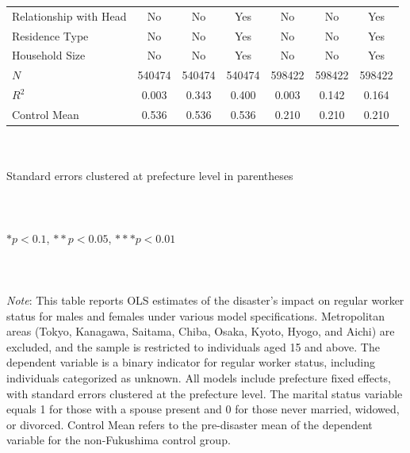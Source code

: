 \documentclass[serif, aspectratio=169]{beamer}
\newcommand{\regularlinks}{%
    \vfill %
    \hfill %
    {\small %
        \hyperlink{regular_placebo}{\beamerbutton{Placebo test}} \,
    }
}
\begin{document}
\begin{frame}[label=regular_status]
\begin{table}[htbp]
\begin{tabular}{@{}l*{6}{c}@{}}
Relationship with Head&       No         &       No         &      Yes         &       No         &       No         &      Yes         \\
Residence Type&       No         &       No         &      Yes         &       No         &       No         &      Yes         \\
Household Size&       No         &       No         &      Yes         &       No         &       No         &      Yes         \\
$\textit{N}$&   540474         &   540474         &   540474         &   598422         &   598422         &   598422         \\
$\textit{R}^2$&    0.003         &    0.343         &    0.400         &    0.003         &    0.142         &    0.164         \\
Control Mean&    0.536         &    0.536         &    0.536         &    0.210         &    0.210         &    0.210         \\
\bottomrule
\end{tabular}
\\\\{\linewidth}{\tiny Standard errors clustered at prefecture level in parentheses}\\\\
\\\\{\linewidth}{\tiny $*p<0.1$, $**p<0.05$, $***p<0.01$}\\\\
\\\\{\linewidth}{\tiny \textit{Note}: This table reports OLS estimates of the disaster's impact on regular worker status for males and females under various model specifications. Metropolitan areas (Tokyo, Kanagawa, Saitama, Chiba, Osaka, Kyoto, Hyogo, and Aichi) are excluded, and the sample is restricted to individuals aged 15 and above. The dependent variable is a binary indicator for regular worker status, including individuals categorized as unknown. All models include prefecture fixed effects, with standard errors clustered at the prefecture level. The marital status variable equals 1 for those with a spouse present and 0 for those never married, widowed, or divorced. Control Mean refers to the pre-disaster mean of the dependent variable for the non-Fukushima control group.}
\end{table}

\vspace{-2.0cm}
\regularlinks

\end{frame}
\end{document}
